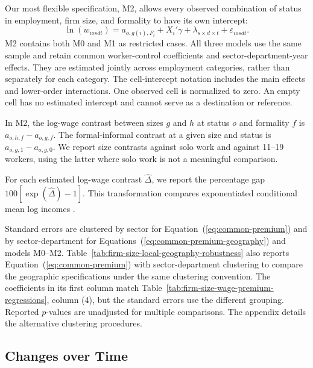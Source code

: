 Our most flexible specification, M2, allows every observed combination of
status in employment, firm size, and formality to have its own intercept:
\begin{equation}\label{eq:status-size-formality}
  \ln(w_{iosdt}) = a_{o,g(i),F_i}+X_i'\gamma
  +\lambda_{s\times d\times t}+\varepsilon_{iosdt}.
\end{equation}
M2 contains both M0 and M1 as restricted cases. All three models use the
same sample and retain common worker-control coefficients and
sector-department-year effects. They are estimated jointly across employment
categories, rather than separately for each category.
The cell-intercept notation includes the main effects and lower-order
interactions. One observed cell is normalized to zero. An empty cell has
no estimated intercept and cannot serve as a destination or reference.

In M2, the log-wage contrast between sizes \(g\) and \(h\) at status \(o\)
and formality \(f\) is \(a_{o,h,f}-a_{o,g,f}\). The formal-informal
contrast at a given size and status is \(a_{o,g,1}-a_{o,g,0}\).
We report size contrasts against solo work and against 11--19 workers,
using the latter where solo work is not a meaningful comparison.

For each estimated log-wage contrast \(\widehat{\Delta}\), we report the percentage gap
\(100[\exp(\widehat{\Delta})-1]\). This transformation compares
exponentiated conditional mean log incomes%
.

Standard errors are clustered by sector for Equation~(\ref{eq:common-premium})
and by sector-department for Equations~(\ref{eq:common-premium-geography})
and models M0--M2.
Table~\ref{tab:firm-size-local-geography-robustness} also reports
Equation~(\ref{eq:common-premium}) with sector-department clustering to
compare the geographic specifications under the same clustering convention.
The coefficients in its first column match Table~\ref{tab:firm-size-wage-premium-regressions},
column (4), but the standard errors use the different grouping.
Reported \(p\)-values are unadjusted for multiple comparisons.
The appendix details the alternative clustering procedures.

\subsection{Changes over Time}

